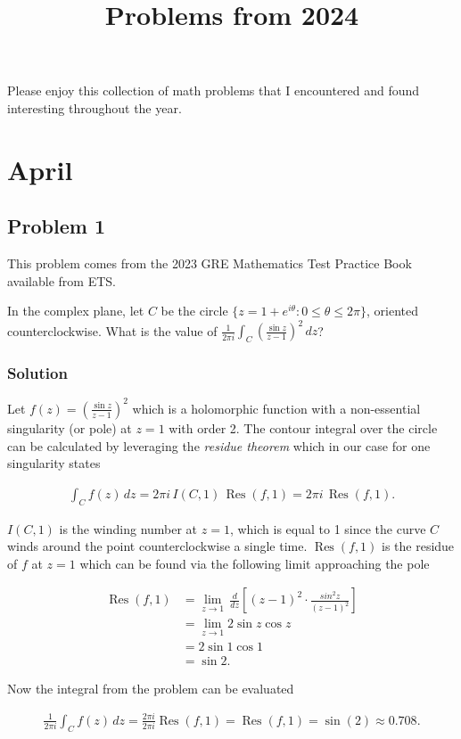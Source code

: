 \documentclass[12pt]{article}
\title{Problems from 2024}
\begin{document}
\maketitle

Please enjoy this collection of math problems that I encountered and found interesting throughout the year.

\setcounter{section}{3}
\section{April}

\subsection{Problem 1}

This problem comes from the 2023 GRE Mathematics Test Practice Book available from ETS.

In the complex plane, let $C$ be the circle $\{ z = 1 + e^{i\theta} : 0 \le \theta \le 2\pi\}$, oriented counterclockwise. What is the value of $\frac{1}{2 \pi i} \int_{C} \left( \frac{\sin z}{z - 1} \right)^2\,dz$?

\subsubsection*{Solution}

Let $f(z) = \left( \frac{\sin z}{z - 1} \right)^2$ which is a holomorphic function with a non-essential singularity (or pole) at $z=1$ with order 2. The contour integral over the circle can be calculated by leveraging the {\em{residue theorem}} which in our case for one singularity states

\begin{align}
  \int_{C} f(z)\, dz = 2 \pi i \, I(C,1) \, \operatorname{Res}(f,1) = 2 \pi i \, \operatorname{Res}(f,1).
\end{align}

$I(C,1)$ is the winding number at $z=1$, which is equal to 1 since the curve $C$ winds around the point counterclockwise a single time. $\operatorname{Res}(f,1)$ is the residue of $f$ at $z=1$ which can be found via the following limit approaching the pole

\begin{align}
  \operatorname{Res}(f,1)
    &= \lim_{z \rightarrow 1} \, \frac{d}{dz} \left[ \left(z - 1\right)^2 \cdot \frac{sin^2 z}{(z-1)^2} \right] \\
    &= \lim_{z \rightarrow 1} 2 \sin z \cos z \\
    &= 2 \sin 1 \cos 1 \\
    &= \sin 2.
\end{align}

Now the integral from the problem can be evaluated

\begin{align}
  \frac{1}{2 \pi i} \int_{C} f(z)\,dz
    = \frac{2 \pi i}{2 \pi i} \operatorname{Res}(f,1)
    = \operatorname{Res}(f,1)
    = \sin(2)
    \approx 0.708.
\end{align}
\end{document}
